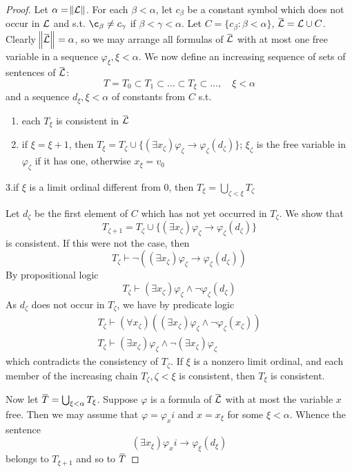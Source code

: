 \documentclass[11pt]{article}
\begin{document}
\begin{proof}
Let \(\alpha=\norm{\mathcal{L}}\). For each \(\beta<\alpha\), let \(c_\beta\) be a
constant symbol which does not occur in \(\mathcal{L}\) and s.t. \(\c_\beta\neq
   c_\gamma\) if \(\beta<\gamma<\alpha\). Let \(C=\{c_\beta:\beta<\alpha\}\),
\(\bbar{\call}=\call\cup C\). Clearly \(\norm{\bbar{\call}}=\alpha\), so we
may arrange all formulas of \(\bbar{\call}\) with at most one free variable
in a sequence \(\varphi_\xi,\xi<\alpha\). We now define an increasing sequence
of sets of sentences of \(\bbar{\call}\):
\begin{equation*}
T=T_0\subset T_1\subset\dots\subset T_\xi\subset\dots,\quad\xi<\alpha
\end{equation*}
and a sequence \(d_\xi,\xi<\alpha\) of constants from \(C\) s.t.
\begin{enumerate}
\item each \(T_\xi\) is consistent in \(\bbar{\call}\)
\item if \(\xi=\xi+1\), then \(T_\xi=T_\zeta\cup\{(\exists
      x_\zeta)\varphi_\zeta\to\varphi_\zeta(d_\zeta)\}\); \(\xi_\zeta\) is the
free variable in \(\varphi_\zeta\) if it has one, otherwise \(x_\xi=v_0\)
\end{enumerate}
3.if \(\xi\) is a limit ordinal different from 0, then
\(T_\xi=\bigcup_{\zeta<\xi}T_\zeta\)


Let \(d_\zeta\) be the first element of \(C\) which has not yet occurred in
\(T_\zeta\). We show that
\begin{equation*}
T_{\zeta+1}=T_\zeta\cup\{(\exists x_\zeta)\varphi_\zeta\to\varphi_\zeta(d_\zeta)\}
\end{equation*}
is consistent. If this were not the case, then
\begin{equation*}
   T_\zeta\vdash\neg((\exists x_\zeta)\varphi_\zeta\to\varphi_\zeta(d_\zeta))
\end{equation*}
By propositional logic
\begin{equation*}
T_\zeta\vdash(\exists x_\zeta)\varphi_\zeta\wedge\neg\varphi_\zeta(d_\zeta)
\end{equation*}
As \(d_\zeta\) does not occur in \(T_\zeta\), we have by predicate logic
\begin{gather*}
T_\zeta\vdash(\forall x_\zeta)((\exists x_\zeta)\varphi_\zeta\wedge\neg\varphi_\zeta
(x_\zeta))\\
T_\zeta\vdash(\exists x_\zeta)\varphi_\zeta\wedge\neg(\exists x_\zeta)\varphi_\zeta
\end{gather*}
which contradicts the consistency of \(T_\zeta\). If \(\xi\) is a nonzero limit
ordinal, and each member of the increasing chain \(T_\zeta,\zeta<\xi\) is
consistent, then \(T_\xi\) is consistent.

Now let \(\bbar{T}=\bigcup_{\xi<\alpha}T_\xi\). Suppose \(\varphi\) is a formula of
\(\bbar{\call}\) with at most the variable \(x\) free. Then we may assume
that \(\varphi=\varphi_xi\) and \(x=x_\xi\) for some \(\xi<\alpha\). Whence the
sentence
\begin{equation*}
(\exists x_\xi)\varphi_xi\to\varphi_\xi(d_\xi)
\end{equation*}
belongs to \(T_{\xi+1}\) and so to \(\bbar{T}\)
\end{proof}
\end{document}
